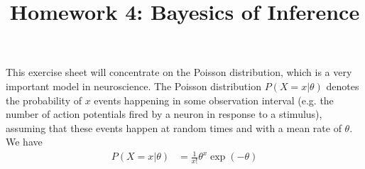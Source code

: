 \documentclass{exam}
\title{Homework 4: Bayesics of Inference}
\date{}
\begin{document}
\maketitle
\thispagestyle{headandfoot}

\begin{center}
  {}
\end{center}
\vspace{.5cm}

This exercise sheet will concentrate on the Poisson distribution, which is a very important model in neuroscience. The Poisson distribution $P(X=x|\theta)$ denotes the probability of $x$ events happening in some observation interval (e.g. the number of action potentials fired by a neuron in response to a stimulus), assuming that these events happen at random times and with a mean rate of  $\theta$. We have
\begin{align}
P(X=x|\theta)&=\frac{1}{x!} \theta^x \exp(-\theta)%
\end{align}
\end{document}
